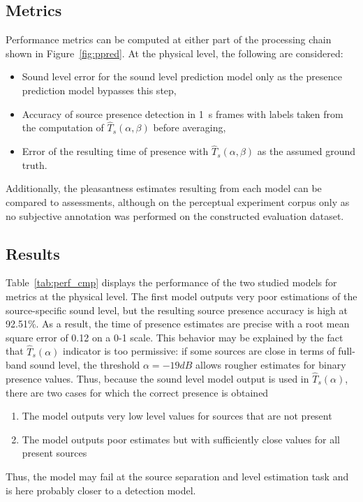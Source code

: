 \documentclass[11pt,a4paper]{article}
\begin{document}
\subsection{Metrics}

Performance metrics can be computed at either part of the processing chain shown in Figure~\ref{fig:ppred}. At the physical level, the following are considered:

\begin{itemize}
\item Sound level error for the sound level prediction model only as the presence prediction model bypasses this step,
\item Accuracy of source presence detection in 1~s frames with labels taken from the computation of $\hat T_s(\alpha, \beta)$ before averaging,
\item Error of the resulting time of presence with $\hat T_s(\alpha, \beta)$ as the assumed ground truth.
\end{itemize}

Additionally, the pleasantness estimates resulting from each model can be compared to assessments, although on the perceptual experiment corpus only as no subjective annotation was performed on the constructed evaluation dataset.

\subsection{Results}

Table~\ref{tab:perf_cmp} displays the performance of the two studied models for metrics at the physical level. The first model outputs very poor estimations of the source-specific sound level, but the resulting source presence accuracy is high at 92.51\%. As a result, the time of presence estimates are precise with a root mean square error of 0.12 on a 0-1 scale. This behavior may be explained by the fact that $\hat T_s(\alpha)$ indicator is too permissive: if some sources are close in terms of full-band sound level, the threshold $\alpha = -19dB$ allows rougher estimates for binary presence values. Thus, because the sound level model output is used in $\hat T_s(\alpha)$, there are two cases for which the correct presence is obtained
\begin{enumerate}
\item The model outputs very low level values for sources that are not present
\item The model outputs poor estimates but with sufficiently close values for all present sources
\end{enumerate}
Thus, the model may fail at the source separation and level estimation task and is here probably closer to a detection model.\\
\end{document}
